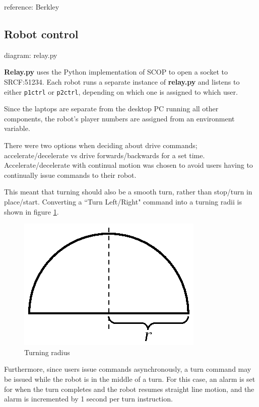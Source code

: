 \documentclass[12pt,a4,notitlepage]{report}
\renewcommand{\_}{\texttt{\symbol{95}}}
\newcommand{\<}{\texttt{\symbol{60}}}
\renewcommand{\>}{\texttt{\symbol{62}}}
\newcommand{\class}[1]{\textbf{#1}}
\newcommand{\scopendpoint}[1]{\texttt{#1}}
\begin{document}
{reference: Berkley}

\subsection{Robot control}

{diagram: relay.py}

\class{Relay.py} uses the Python implementation of SCOP to open a socket to SRCF:51234. Each robot runs a separate instance of \class{relay.py} and listens to either \scopendpoint{p1ctrl} or \scopendpoint{p2ctrl}, depending on which one is assigned to which user. 

Since the laptops are separate from the desktop PC running all other components, the robot's player numbers are assigned from an environment variable.

There were two options when deciding about drive commands; accelerate/decelerate vs drive forwards/backwards for a set time. Accelerate/decelerate with continual motion was chosen to avoid users having to continually issue commands to their robot.

This meant that turning should also be a smooth turn, rather than stop/turn in place/start. Converting a ``Turn Left/Right" command into a turning radii is shown in figure \ref{tradius}.

\begin{figure}
\centering
\includegraphics[scale=1.0,angle=0]{diagrams/turningradius.ps}
\caption{Turning radius}
\label{tradius}
\end{figure}

Furthermore, since users issue commands asynchronously, a turn command may be issued while the robot is in the middle of a turn. For this case, an alarm is set for when the turn completes and the robot resumes straight line motion, and the alarm is incremented by 1 second per turn instruction. 
\end{document}
